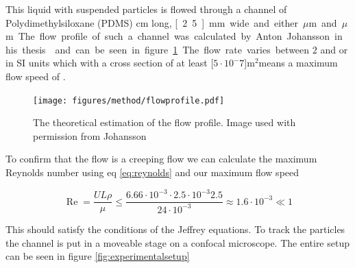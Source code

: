 This liquid with suspended particles is flowed through a channel of Polydimethylsiloxane (PDMS) \unit[4]{cm} long,
 \unit[2.5]{mm} wide and either \unit[200]{$\mu$m} and \unit[500]{$\mu$m}. The flow profile of such a channel was 
 calculated by Anton Johansson in his thesis\cite{AntonThesis} and can be seen in figure \ref{fig:flowprofile}. The 
 flow rate varies  between $2$ and  or in SI units  
 which with a cross section of at least \unit[$5\cdot 10^-7$]{m$^2$}means a maximum flow speed of  
 .

\begin{figure}[H]
\begin{center}
\texttt{[image: figures/method/flowprofile.pdf]}
\end{center}
\caption{The theoretical estimation of the flow profile. Image used with permission from Johansson \cite{AntonThesis}}
\label{fig:flowprofile}
\end{figure}


To confirm that the flow is a creeping flow we can calculate the maximum Reynolds number using eq \ref{eq:reynolds} and 
our maximum flow speed 

\begin{equation}
\operatorname{Re} = \frac{U L \rho}{\mu} 
\leq \frac{6.66\cdot 10^{-3} \cdot 2.5 \cdot 10^{-3} 2.5 }{24 \cdot 10^{-3}} 
\approx	 	1.6  \cdot 10^{-3} \ll 1
\end{equation}

This should satisfy the conditions of the Jeffrey equations. To track the particles the channel is put in a moveable stage on a confocal microscope. The entire setup can be seen in figure \ref{fig:experimentalsetup}

